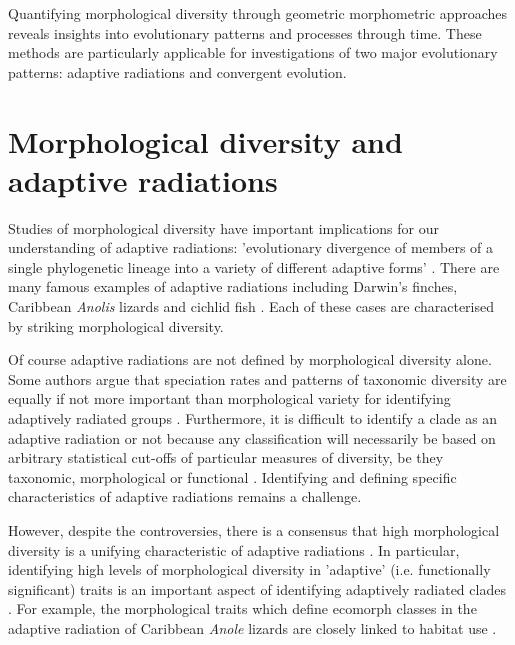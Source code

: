 	Quantifying morphological diversity through geometric morphometric approaches reveals insights into evolutionary patterns and processes through time. These methods are particularly applicable for investigations of two major evolutionary patterns: adaptive radiations and convergent evolution.
\section{Morphological diversity and adaptive radiations}

	Studies of morphological diversity have important implications for our understanding of adaptive radiations: 'evolutionary divergence of members of a single phylogenetic lineage into a variety of different adaptive forms' \citep[Futuyama 1998, cited by][]{Losos2010}.
	There are many famous examples of adaptive radiations including Darwin's finches, Caribbean \textit{Anolis} lizards and cichlid fish \citep{Gavrilets2009}. Each of these cases are characterised by striking morphological diversity.
	
	Of course adaptive radiations are not defined by morphological diversity alone. Some authors argue that speciation rates and patterns of taxonomic diversity are equally if not more important than morphological variety for identifying adaptively radiated groups \citep{Glor2010, Losos2010a}. Furthermore, it is difficult to identify a clade as an adaptive radiation or not because any classification will necessarily be based on arbitrary statistical cut-offs of particular measures of diversity, be they taxonomic, morphological or functional \citep{Olson2009}. Identifying and defining specific characteristics of adaptive radiations remains a challenge.
	
		
	However, despite the controversies, there is a consensus that high morphological diversity is a unifying characteristic of adaptive radiations \citep{Losos2010a, Olson2009}. In particular, identifying high levels of morphological diversity in 'adaptive' (i.e. functionally significant) traits is an important aspect of identifying adaptively radiated clades \citep{Losos2010a}. For example, the morphological traits which define ecomorph classes in the adaptive radiation of Caribbean \textit{Anole} lizards are closely linked to habitat use \citep{Losos1998}.

